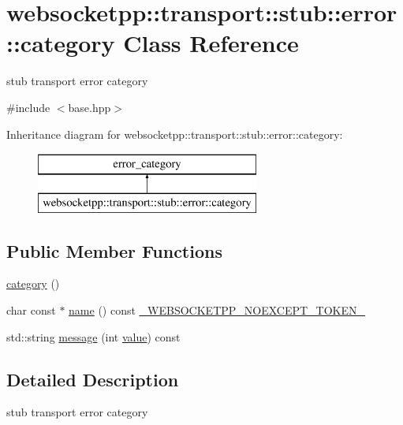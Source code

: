 \hypertarget{classwebsocketpp_1_1transport_1_1stub_1_1error_1_1category}{}\section{websocketpp\+:\+:transport\+:\+:stub\+:\+:error\+:\+:category Class Reference}
\label{classwebsocketpp_1_1transport_1_1stub_1_1error_1_1category}


stub transport error category  




{\ttfamily \#include $<$base.\+hpp$>$}

Inheritance diagram for websocketpp\+:\+:transport\+:\+:stub\+:\+:error\+:\+:category\+:\begin{figure}[H]
\begin{center}
\leavevmode
\includegraphics[height=2.000000cm]{classwebsocketpp_1_1transport_1_1stub_1_1error_1_1category}
\end{center}
\end{figure}
\subsection*{Public Member Functions}
\begin{DoxyCompactItemize}
\item 
\hyperlink{classwebsocketpp_1_1transport_1_1stub_1_1error_1_1category_a85ac03c6cef394a6e160723751fde4bf}{category} ()
\item 
char const $\ast$ \hyperlink{classwebsocketpp_1_1transport_1_1stub_1_1error_1_1category_a9ba015d3bbd5b18d1cf8d64cd0a60e31}{name} () const \hyperlink{boost__config_8hpp_aa19747404a5f2fe9c9eb9e9d2e48f26c}{\+\_\+\+W\+E\+B\+S\+O\+C\+K\+E\+T\+P\+P\+\_\+\+N\+O\+E\+X\+C\+E\+P\+T\+\_\+\+T\+O\+K\+E\+N\+\_\+}
\item 
std\+::string \hyperlink{classwebsocketpp_1_1transport_1_1stub_1_1error_1_1category_a695b81d53a7dec467c74c2e9ebf993cd}{message} (int \hyperlink{namespacewebsocketpp_1_1transport_1_1stub_1_1error_abff42d9e608f90864af8d628f6932022}{value}) const 
\end{DoxyCompactItemize}


\subsection{Detailed Description}
stub transport error category 

